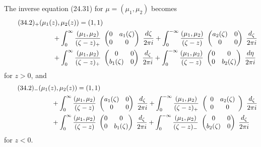 \documentclass{surv-l}
\theoremstyle{plain}
\theoremstyle{definition}
\numberwithin{equation}{chapter}
\begin{document}
The inverse equation (24.31) for $\mu=(\mu_{1},\mu_{2})$ becomes
\setcounter{equation}{1}
\begin{align*}
\tag*{$(34.2)_{+}$}
&(\mu_{1}(z), \mu_{2}(z))=(1, 1)\\\nonumber
&\qquad +\int_{0}^{\infty}\frac{(\mu_{1},\mu_{2})}{(\zeta-z)_{+}}\ \left(\begin{array}{@{}cc@{}}
0 & a_{1}(\zeta)\\
0 & 0
\end{array}\right)\ \frac{d{\zeta}}{2\pi i}+\int_{0}^{-\infty}\frac{(\mu_{1},\mu_{2})}{(\zeta-z)}\ \left(\begin{array}{@{}cc@{}}
a_{2}(\zeta) & 0\\
0 & 0
\end{array}\right)\ \frac{d_{\zeta}}{2\pi i}\\ \notag
&\qquad +\int_{0}^{\infty}\frac{(\mu_{1},\mu_{2})}{(\zeta-z)_{+}}\ \left(\begin{array}{@{}cc@{}}
0 & 0\\
b_{1}(\zeta) & 0
\end{array}\right)\ \frac{d_{\zeta}}{2\pi i}+\int_{0}^{-\infty}\frac{(\mu_{1},\mu_{2})}{(\zeta-z)}\ \left(\begin{array}{@{}cc@{}}
0 & 0\\
0 & b_{2}(\zeta)
\end{array}\right)\ \frac{d\eta}{2\pi i} \notag
\end{align*}
for $z>0$, and
\begin{align*}
\tag*{$(34.2)_{-}$}
&(\mu_{1}(z), \mu_{2}(z))=(1, 1)\\
&\qquad+\int_{0}^{\infty}\frac{(\mu_{1},\mu_{2})}{(\zeta-z)}\ \left(\begin{array}{@{}cc@{}}
a_{1}(\zeta) & 0\\
0 & 0
\end{array}\right)\ \frac{d_{\zeta}}{2\pi i}+\int_{0}^{-\infty}\frac{(\mu_{1},\mu_{2})}{(\zeta-z)_{+}}\ \left(\begin{array}{lc}
0 & a_{2}(\zeta)\\
0 & 0
\end{array}\right)\ \frac{d_{\zeta}}{2\pi i}\\ \notag
&\qquad+\int_{0}^{\infty}\frac{(\mu_{1},\mu_{2})}{(\zeta-z)}\ \left(\begin{array}{@{}cc@{}}
0 & 0\\
0 & b_{1}(\zeta)
\end{array}\right)\ \frac{d_{\zeta}}{2\pi i}+\int_{0}^{-\infty}\frac{(\mu_{1},\mu_{2})}{(\zeta-z)_{-}}\ \left(\begin{array}{@{}cc@{}}
0 & 0\\
b_{2}(\zeta) & 0
\end{array}\right)\ \frac{d_{\zeta}}{2\pi i} \notag
\end{align*}
for $z<0$.
\end{document}
